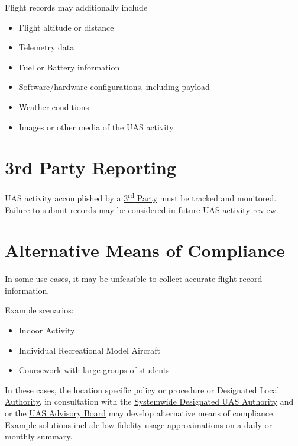 \documentclass[
]{book}
\providecommand{\tightlist}{%
  \setlength{\itemsep}{0pt}\setlength{\parskip}{0pt}}
\begin{document}
Flight records may additionally include

\begin{itemize}
\tightlist
\item
  Flight altitude or distance
\item
  Telemetry data
\item
  Fuel or Battery information
\item
  Software/hardware configurations, including payload
\item
  Weather conditions
\item
  Images or other media of the \protect\hyperlink{UASactivity}{UAS activity}
\end{itemize}

\hypertarget{s-3rdparty-reporting}{%
\section{3rd Party Reporting}\label{s-3rdparty-reporting}}

UAS activity accomplished by a \protect\hyperlink{rdparty}{3\textsuperscript{rd} Party} must be tracked and monitored. Failure to submit records may be considered in future \protect\hyperlink{UASactivity}{UAS activity} review.

\hypertarget{s-AMOC}{%
\section{Alternative Means of Compliance}\label{s-AMOC}}

In some use cases, it may be unfeasible to collect accurate flight record information.

Example scenarios:

\begin{itemize}
\tightlist
\item
  Indoor Activity
\item
  Individual Recreational Model Aircraft
\item
  Coursework with large groups of students
\end{itemize}

In these cases, the \protect\hyperlink{LSP}{location specific policy or procedure} or \protect\hyperlink{DLA}{Designated Local Authority}, in consultation with the \protect\hyperlink{SDA}{Systemwide Designated UAS Authority} and or the \protect\hyperlink{AB}{UAS Advisory Board} may develop alternative means of compliance. Example solutions include low fidelity usage approximations on a daily or monthly summary.
\end{document}
